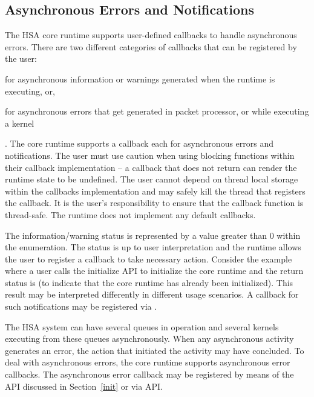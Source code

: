 \documentclass[draft]{book}
\begin{document}
\hypertarget{asyncerror}{}\subsection{Asynchronous Errors and
Notifications}\label{asyncerror}

The HSA core runtime supports user-defined callbacks to handle asynchronous
errors. There are two different categories of callbacks that can be registered
by the user:\begin{inparaenum}[(i)]\item for asynchronous information or
  warnings generated when the runtime is executing, or, \item for asynchronous
  errors that get generated in packet processor, or while executing a
  kernel \end{inparaenum}. The core runtime supports a callback each for
asynchronous errors and notifications. The user must use caution when using
blocking functions within their callback implementation -- a callback that does
not return can render the runtime state to be undefined. The user cannot depend
on thread local storage within the callbacks implementation and may safely kill
the thread that registers the callback. It is the user's responsibility to
ensure that the callback function is thread-safe. The runtime does not implement
any default callbacks.

The information/warning status is represented by a value greater than 0 within
the  enumeration. The status is up to user interpretation
and the runtime allows the user to register a callback to take necessary
action. Consider the example where a user calls the initialize API to initialize
the core runtime and the return status is
 (to indicate that the core
runtime has already been initialized). This result may be interpreted
differently in different usage scenarios. A callback for such notifications may
be registered via .

The HSA system can have several queues in operation and several kernels
executing from these queues asynchronously. When any asynchronous activity
generates an error, the action that initiated the activity may have
concluded. To deal with asynchronous errors, the core runtime supports
asynchronous error callbacks. The asynchronous error callback may be registered
by means of the  API discussed in Section~\ref{init} or via
 API.
\end{document}
